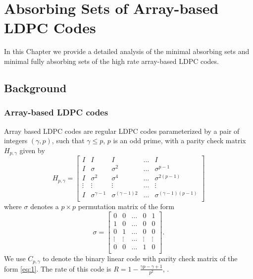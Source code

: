 \chapter[Absorbing Sets of Array-based LDPC Codes]{Absorbing Sets of Array-based LDPC
Codes}\label{arrayabs}

In this Chapter we provide a detailed analysis of the  minimal
absorbing sets and minimal fully absorbing sets of the high rate
array-based LDPC codes.



\section{Background}\label{back}
\subsection{Array-based LDPC codes}




Array based LDPC codes \cite{fan} are regular LDPC codes
parameterized by a pair of integers $(\gamma, p)$, such that
$\gamma \leq p$, $p$ is an odd prime, with a parity check matrix
$H_{p,\gamma}$ given by
\begin{equation}\label{eq:1}
H_{p,\gamma}=\left[\begin{array}{ccccc}
I & I & I & \ldots & I\\
I & \sigma & \sigma^2 & \ldots &\sigma^{p-1}\\
I & \sigma^2 & \sigma^4 & \ldots &\sigma^{2(p-1)}\\
\vdots & \vdots & \vdots & \ldots & \vdots \\
I & \sigma^{\gamma-1} & \sigma^{(\gamma-1)2} & \ldots &\sigma^{(\gamma-1)(p-1)}\\
\end{array}
\right]
\end{equation}\normalsize
where $\sigma$ denotes a $p \times p$ permutation matrix of the
form \small
\begin{equation}
\sigma=\left[\begin{array}{ccccc}
0 & 0 & \ldots & 0 & 1\\
1 & 0 & \ldots & 0 & 0\\
0 & 1 & \ldots & 0 & 0\\
\vdots & \vdots & \ldots & \vdots & \vdots\\
0 & 0 & \ldots & 1 & 0\\
\end{array}
\right].
\end{equation}
\normalsize We use $C_{p,\gamma}$ to denote the binary linear code
with parity check matrix of the form \eqref{eq:1}. The rate of
this code is $R=1-\frac{\gamma p-\gamma+1}{p^2}$,
\cite{mittel:02}.

